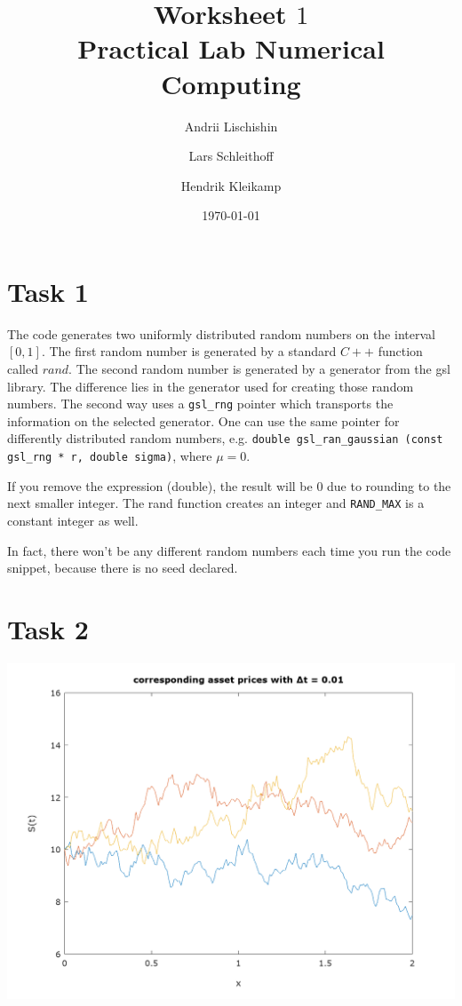 \documentclass[10pt,a4paper]{article}
\begin{document}
\title{Worksheet $1$\\
\small{Practical Lab Numerical Computing}}
\author{Andrii Lischishin \and Lars Schleithoff \and Hendrik Kleikamp}
\date{\today}
\maketitle

\section*{Task 1}

The code generates two uniformly distributed random numbers on the interval $[0,1]$. The first random number is generated by a standard $C++$ function called $rand$.
The second random number is generated by a generator from the gsl library.
The difference lies in the generator used for creating those random numbers. The second way uses a \texttt{gsl\_rng} pointer which transports the information on the selected generator. 
One can use the same pointer for differently distributed random numbers, e.g. \texttt{double gsl\_ran\_gaussian (const gsl\_rng * r, double sigma)}, where $\mu=0$. 

If you remove the expression (double), the result will be $0$ due to rounding to the next smaller integer. The rand function creates an integer and \texttt{RAND\_MAX} is a constant integer as well. 

In fact, there won't be any different random numbers each time you run the code snippet, because there is no seed declared. 

\section*{Task 2}

\begin{center}
\includegraphics[scale=0.5]{asset_001.jpeg}		
\end{center}	
\end{document}
